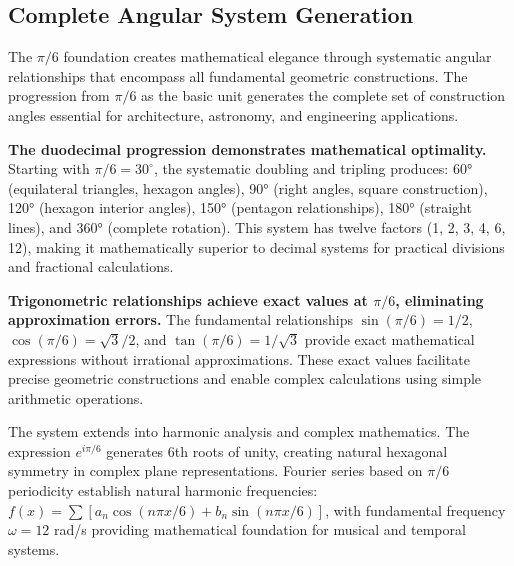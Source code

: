 \documentclass[11pt]{article}
\begin{document}
\subsection{Complete Angular System Generation}

The $\pi/6$ foundation creates mathematical elegance through systematic angular relationships that encompass all fundamental geometric constructions. The progression from $\pi/6$ as the basic unit generates the complete set of construction angles essential for architecture, astronomy, and engineering applications.

\textbf{The duodecimal progression demonstrates mathematical optimality.} Starting with $\pi/6 = 30^\circ$, the systematic doubling and tripling produces: 60° (equilateral triangles, hexagon angles), 90° (right angles, square construction), 120° (hexagon interior angles), 150° (pentagon relationships), 180° (straight lines), and 360° (complete rotation). This system has twelve factors (1, 2, 3, 4, 6, 12), making it mathematically superior to decimal systems for practical divisions and fractional calculations.

\textbf{Trigonometric relationships achieve exact values at $\pi/6$, eliminating approximation errors.} The fundamental relationships $\sin(\pi/6) = 1/2$, $\cos(\pi/6) = \sqrt{3}/2$, and $\tan(\pi/6) = 1/\sqrt{3}$ provide exact mathematical expressions without irrational approximations. These exact values facilitate precise geometric constructions and enable complex calculations using simple arithmetic operations.

The system extends into harmonic analysis and complex mathematics. The expression $e^{i\pi/6}$ generates 6th roots of unity, creating natural hexagonal symmetry in complex plane representations. Fourier series based on $\pi/6$ periodicity establish natural harmonic frequencies: $f(x) = \sum[a_n\cos(n\pi x/6) + b_n\sin(n\pi x/6)]$, with fundamental frequency $\omega = 12$ rad/s providing mathematical foundation for musical and temporal systems.
\end{document}
